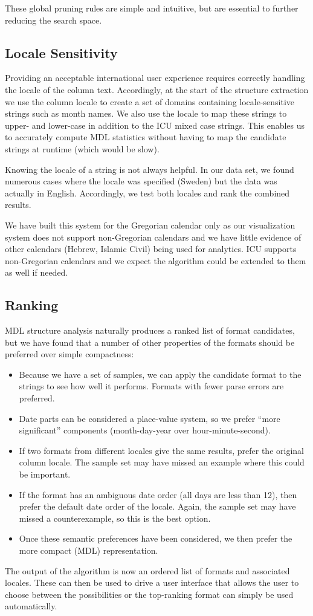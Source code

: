 These global pruning rules are simple and intuitive, but are essential to further reducing the search space.

\subsection{Locale Sensitivity}
Providing an acceptable international user experience requires correctly handling the locale of the column text. Accordingly, at the start of the structure extraction we use the column locale to create a set of domains containing locale-sensitive strings such as month names. We also use the locale to map these strings to upper- and lower-case in addition to the ICU mixed case strings. This enables us to accurately compute MDL statistics without having to map the candidate strings at runtime (which would be slow).

Knowing the locale of a string is not always helpful. In our data set, we found numerous cases where the locale was specified (\eg Sweden) but the data was actually in English. Accordingly, we test both locales and rank the combined results. 

We have built this system for the Gregorian calendar only as our visualization system does not support non-Gregorian calendars and we have little evidence of other calendars (\eg Hebrew, Islamic Civil) being used for analytics. ICU supports non-Gregorian calendars and we expect the algorithm could be extended to them as well if needed.

\subsection{Ranking}
MDL structure analysis naturally produces a ranked list of format candidates, but we have found that a number of other properties of the formats should be preferred over simple compactness:
\begin{itemize}
\item Because we have a set of samples, we can apply the candidate format to the strings to see how well it performs. Formats with fewer parse errors are preferred.
\item Date parts can be considered a place-value system, so we prefer ``more significant'' components (\eg month-day-year over hour-minute-second).
\item If two formats from different locales give the same results, prefer the original column locale. The sample set may have missed an example where this could be important.
\item If the format has an ambiguous date order (\eg all days are less than 12), then prefer the default date order of the locale. Again, the sample set may have missed a counterexample, so this is the best option.
\item Once these semantic preferences have been considered, we then prefer the more compact (MDL) representation.
\end{itemize}

The output of the algorithm is now an ordered list of formats and associated locales. These can then be used to drive a user interface that allows the user to choose between the possibilities or the top-ranking format can simply be used automatically.

